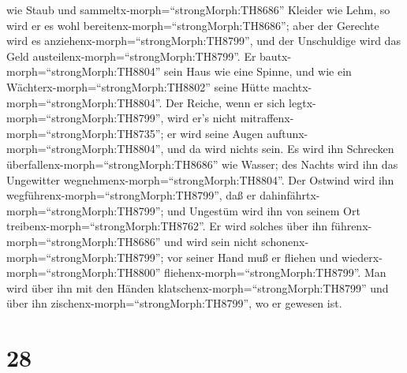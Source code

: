 wie Staub und sammeltx-morph=``strongMorph:TH8686'' Kleider wie Lehm,
 so wird er es wohl bereitenx-morph=``strongMorph:TH8686'';
aber der Gerechte wird es anziehenx-morph=``strongMorph:TH8799'', und
der Unschuldige wird das Geld austeilenx-morph=``strongMorph:TH8799''.
 Er bautx-morph=``strongMorph:TH8804'' sein Haus wie eine
Spinne, und wie ein Wächterx-morph=``strongMorph:TH8802'' seine Hütte
machtx-morph=``strongMorph:TH8804''.  Der Reiche, wenn er
sich legtx-morph=``strongMorph:TH8799'', wird er's nicht
mitraffenx-morph=``strongMorph:TH8735''; er wird seine Augen
auftunx-morph=``strongMorph:TH8804'', und da wird nichts sein.
 Es wird ihn Schrecken
überfallenx-morph=``strongMorph:TH8686'' wie Wasser; des Nachts wird ihn
das Ungewitter wegnehmenx-morph=``strongMorph:TH8804''. 
Der Ostwind wird ihn wegführenx-morph=``strongMorph:TH8799'', daß er
dahinfährtx-morph=``strongMorph:TH8799''; und Ungestüm wird ihn von
seinem Ort treibenx-morph=``strongMorph:TH8762''.  Er wird
solches über ihn führenx-morph=``strongMorph:TH8686'' und wird sein
nicht schonenx-morph=``strongMorph:TH8799''; vor seiner Hand muß er
fliehen und wiederx-morph=``strongMorph:TH8800''
fliehenx-morph=``strongMorph:TH8799''.  Man wird über ihn
mit den Händen klatschenx-morph=``strongMorph:TH8799'' und über ihn
zischenx-morph=``strongMorph:TH8799'', wo er gewesen ist.

\hypertarget{section-27}{%
\section{28}\label{section-27}}

